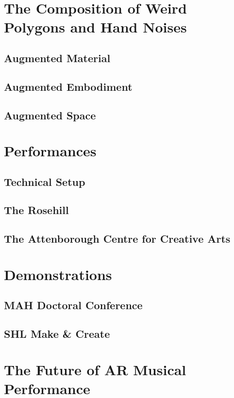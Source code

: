 \section{The Composition of Weird Polygons and Hand Noises} \label{sec: polygons-composition}
\subsection{Augmented Material} \label{sec: polygons-composition-material}

\subsection{Augmented Embodiment} \label{sec: polygons-composition-embodiment}

\subsection{Augmented Space} \label{sec: polygons-composition-space}



\section{Performances} \label{sec: polygons-performances}
\subsection{Technical Setup} \label{sec: polygons-performances-setup}
\subsection{The Rosehill} \label{sec: polygons-performances-rosehill}
\subsection{The Attenborough Centre for Creative Arts} \label{sec: polygons-performances-acca}



\section{Demonstrations} \label{sec: polygons-demonstrations}
\subsection{MAH Doctoral Conference} \label{sec: polygons-demonstrations-mah}
\subsection{SHL Make \& Create} \label{sec: polygons-demonstrations-shl}



\section{The Future of AR Musical Performance}